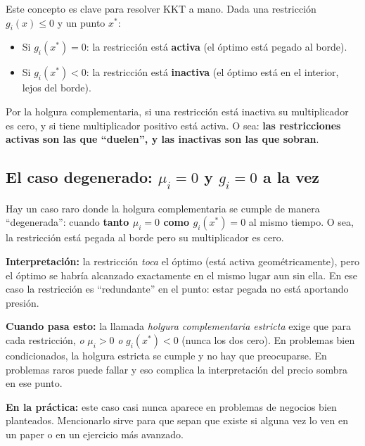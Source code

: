 \documentclass[12pt]{article}
\begin{document}
Este concepto es clave para resolver KKT a mano. Dada una restricción $g_i(x) \leq 0$ y un punto $x^*$:

\begin{itemize}
    \item Si $g_i(x^*) = 0$: la restricción está \textbf{activa} (el óptimo está pegado al borde).
    \item Si $g_i(x^*) < 0$: la restricción está \textbf{inactiva} (el óptimo está en el interior, lejos del borde).
\end{itemize}

\vspace{0.5em}

Por la holgura complementaria, si una restricción está inactiva su multiplicador es cero, y si tiene multiplicador positivo está activa. O sea: \textbf{las restricciones activas son las que ``duelen'', y las inactivas son las que sobran}.

\subsection{El caso degenerado: $\mu_i = 0$ y $g_i = 0$ a la vez}

Hay un caso raro donde la holgura complementaria se cumple de manera ``degenerada'': cuando \textbf{tanto $\mu_i = 0$ como $g_i(x^*) = 0$} al mismo tiempo. O sea, la restricción está pegada al borde pero su multiplicador es cero.

\vspace{0.5em}

\textbf{Interpretación:} la restricción \textit{toca} el óptimo (está activa geométricamente), pero el óptimo se habría alcanzado exactamente en el mismo lugar aun sin ella. En ese caso la restricción es ``redundante'' en el punto: estar pegada no está aportando presión.

\vspace{0.5em}

\textbf{Cuando pasa esto:} la llamada \textit{holgura complementaria estricta} exige que para cada restricción, \textit{o} $\mu_i > 0$ \textit{o} $g_i(x^*) < 0$ (nunca los dos cero). En problemas bien condicionados, la holgura estricta se cumple y no hay que preocuparse. En problemas raros puede fallar y eso complica la interpretación del precio sombra en ese punto.

\vspace{0.5em}

\textbf{En la práctica:} este caso casi nunca aparece en problemas de negocios bien planteados. Mencionarlo sirve para que sepan que existe si alguna vez lo ven en un paper o en un ejercicio más avanzado.
\end{document}
